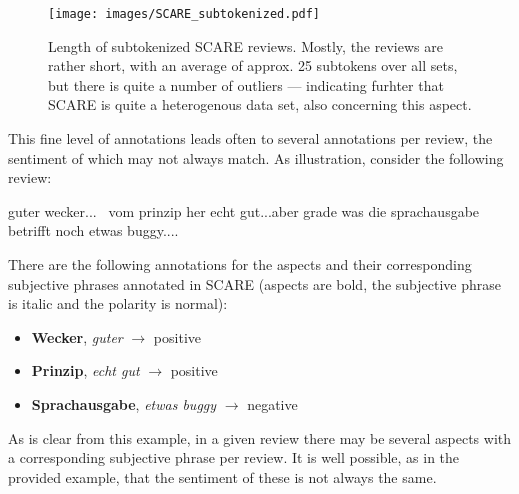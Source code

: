 \begin{wrapfigure}[20]{r}{0.45\linewidth}
  \centering
    \texttt{[image: images/SCARE\_subtokenized.pdf]}
  \label{fig:scare-subtokenized}
  \caption[SCARE Lengths]{Length of subtokenized SCARE reviews. Mostly, the reviews are rather short, with an average of approx. 25 subtokens over all sets,
                        but there is quite a number of outliers --- indicating furhter that SCARE is quite a heterogenous data set, also concerning this aspect.}
\end{wrapfigure}


This fine level of annotations leads often to several annotations per review, the sentiment of
which may not always match.
As illustration, consider the following review:

\begin{examples}
  \label{ex:fine-grained-anno}
  \item guter wecker... \textbar\textbar\ vom prinzip her echt gut...aber grade was die sprachausgabe betrifft noch etwas buggy....
\end{examples}

There are the following annotations for the aspects and their corresponding subjective
phrases annotated in SCARE (aspects are bold, the subjective phrase is italic and the
polarity is normal):

\begin{itemize}
  \item \textbf{Wecker}, \textit{guter} $\rightarrow$ positive
  \item \textbf{Prinzip}, \textit{echt gut} $\rightarrow$ positive
  \item \textbf{Sprachausgabe}, \textit{etwas buggy} $\rightarrow$ negative
\end{itemize}

As is clear from this example, in a given review there may be several aspects with a corresponding
subjective phrase per review. It is well possible, as in the provided example, that the sentiment
of these is not always the same.


